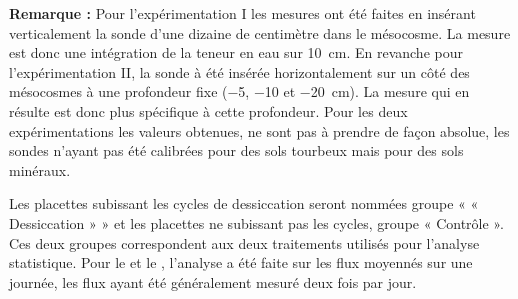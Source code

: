 \begin{center}
\begin{minipage}{.85\textwidth}
\setlength{\parindent}{-10pt}%
\onehalfspacing
\textbf{Remarque :} %
Pour l'expérimentation I les mesures ont été faites en insérant verticalement la sonde d'une dizaine de centimètre dans le mésocosme.
La mesure est donc une intégration de la teneur en eau sur \SI{10}{\centi\metre}.
En revanche pour l'expérimentation II, la sonde à été insérée horizontalement sur un côté des mésocosmes à une profondeur fixe (\num{-5}, \num{-10} et \SI{-20}{\centi\metre}).
La mesure qui en résulte est donc plus spécifique à cette profondeur.
Pour les deux expérimentations les valeurs obtenues, ne sont pas à prendre de façon absolue, les sondes n'ayant pas été calibrées pour des sols tourbeux mais pour des sols minéraux.
\end{minipage}
\end{center}
Les placettes subissant les cycles de dessiccation seront nommées groupe « « Dessiccation » » et les placettes ne subissant pas les cycles, groupe « Contrôle ».
Ces deux groupes correspondent aux deux traitements utilisés pour l'analyse statistique.
Pour le \coo et le \chh, l'analyse a été faite sur les flux moyennés sur une journée, les flux ayant été généralement mesuré deux fois par jour.



